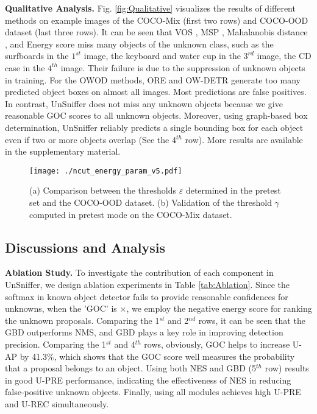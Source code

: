 \documentclass[10pt,twocolumn,letterpaper]{article}
\newcommand{\net}{UnSniffer\xspace}
\begin{document}
\noindent\textbf{Qualitative Analysis.}
\label{sec:Qualitative}
Fig. \ref{fig:Qualitative} visualizes the results of different methods on example images of the COCO-Mix (first two rows) and COCO-OOD dataset (last three rows).
It can be seen that VOS \cite{vos}, MSP \cite{hendrycks2016baseline}, Mahalanobis distance \cite{denouden2018improving}, and Energy score \cite{liu2020energy} miss many objects of the unknown class,
such as the surfboards in the $1^{st}$ image,
the keyboard and water cup in the $3^{rd}$ image,
the CD case in the $4^{th}$ image.
Their failure is due to the suppression of unknown objects in training.
For the OWOD methods,
ORE and OW-DETR generate too many predicted object boxes on almost all images.
Most predictions are false positives.
In contrast,
UnSniffer does not miss any unknown objects because we give reasonable GOC scores to all unknown objects.
Moreover, using graph-based box determination,
UnSniffer reliably predicts a single bounding box for each object even if two or more objects overlap (See the 4$^{th}$ row).
More results are available in the supplementary material.



\begin{figure}
\centering
\texttt{[image: ./ncut\_energy\_param\_v5.pdf]}
\vspace{-2em}
\caption{
(a) Comparison between the thresholds $\varepsilon$ determined in the pretest set and the COCO-OOD dataset. 
(b) Validation of the threshold $\gamma$ computed in pretest mode on the COCO-Mix dataset.
}
\vspace{-14pt}
\label{fig:pretest}
\end{figure}

\subsection{Discussions and Analysis}
\label{sec:Analysis}
\noindent\textbf{Ablation Study.}
To investigate the contribution of each component in \net,
we design ablation experiments in Table \ref{tab:Ablation}.
Since the softmax in known object detector fails to provide reasonable confidences for unknowns,
when the 'GOC' is $\times$,
we employ the negative energy score for ranking the unknown proposals.
Comparing the 1$^{st}$ and 2$^{nd}$ rows,
it can be seen that the GBD outperforms NMS,
and GBD plays a key role in improving detection precision.
Comparing the 1$^{st}$ and 4$^{th}$ rows,
obviously,
GOC helps to increase U-AP by 41.3\%,
which shows that the GOC score well measures the probability that a proposal belongs to an object.
Using both NES and GBD (5$^{th}$ row) results in good U-PRE performance,
indicating the effectiveness of NES in reducing false-positive unknown objects.
Finally, using all modules achieves high U-PRE and U-REC simultaneously.
\end{document}

